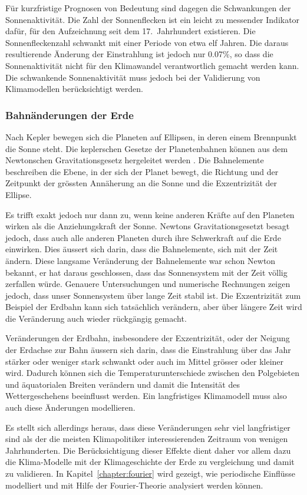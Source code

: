Für kurzfristige Prognosen von Bedeutung sind dagegen die Schwankungen
der Sonnenaktivität.
%
Die Zahl der Sonnenflecken ist ein leicht zu messender Indikator
dafür, für den Aufzeichnung seit dem 17.~Jahrhundert existieren.
Die Sonnenfleckenzahl schwankt mit einer Periode von etwa elf Jahren.
Die daraus resultierende Änderung der Einstrahlung ist jedoch nur 0.07\%,
so dass die Sonnenaktivität nicht für den Klimawandel verantwortlich
gemacht werden kann. 
Die schwankende Sonnenaktivität muss jedoch bei der Validierung
von Klimamodellen berücksichtigt werden.

\subsubsection{Bahnänderungen der Erde}
%
Nach Kepler bewegen sich die Planeten auf Ellipsen,
in deren einem Brennpunkt die Sonne steht.
Die keplerschen Gesetze der Planetenbahnen können aus dem Newtonschen 
Gravitationsgesetz hergeleitet werden
\cite[\S 6]{skript:joos}.
%
Die Bahnelemente beschreiben die Ebene, in der sich der Planet bewegt,
die Richtung und der Zeitpunkt der grössten Annäherung an die Sonne und
die Exzentrizität der Ellipse.
%

Es trifft exakt jedoch nur dann zu, wenn keine anderen Kräfte auf den
Planeten wirken als die Anziehungskraft der Sonne.
Newtons Gravitationsgesetzt besagt jedoch, dass auch alle anderen
Planeten durch ihre Schwerkraft auf die Erde einwirken.
Dies äussert sich darin, dass die Bahnelemente, sich mit der Zeit
ändern.
Diese langsame Veränderung der Bahnelemente war schon Newton bekannt,
er hat daraus geschlossen, dass das Sonnensystem mit der Zeit völlig
zerfallen würde.
Genauere Untersuchungen und numerische Rechnungen zeigen jedoch, dass
unser Sonnensystem über lange Zeit stabil ist.
Die Exzentrizität zum Beispiel der Erdbahn kann sich tatsächlich verändern,
aber über längere Zeit wird die Veränderung auch wieder rückgängig
gemacht.

Veränderungen der Erdbahn, insbesondere der Exzentrizität, oder der
Neigung der Erdachse zur Bahn äussern sich darin, dass die Einstrahlung
über das Jahr stärker oder weniger stark schwankt oder auch im Mittel
grösser oder kleiner wird.
%
Dadurch können sich die Temperaturunterschiede zwischen den Polgebieten und
äquatorialen Breiten verändern und damit die Intensität des Wettergeschehens
beeinflusst werden.
Ein langfristiges Klimamodell muss also auch diese Änderungen
modellieren.

Es stellt sich allerdings heraus, dass diese Veränderungen sehr viel
langfristiger sind als der die meisten Klimapolitiker interessierenden
Zeitraum von wenigen Jahrhunderten.
Die Berücksichtigung dieser Effekte dient daher vor allem dazu die
Klima-Modelle mit der Klimageschichte der Erde zu vergleichung und
damit zu validieren.
In Kapitel~\ref{chapter:fourier} wird gezeigt, wie periodische Einflüsse
modelliert und mit Hilfe der Fourier-Theorie analysiert werden können.

